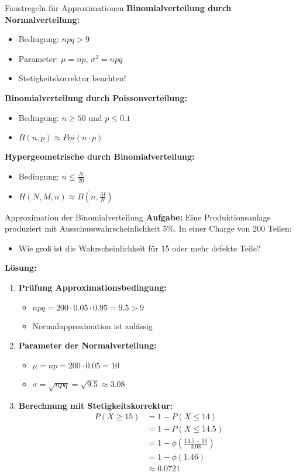 \begin{concept}{Faustregeln für Approximationen}
\textbf{Binomialverteilung durch Normalverteilung:}
\begin{itemize}
  \item Bedingung: $npq > 9$
  \item Parameter: $\mu = np$, $\sigma^2 = npq$
  \item Stetigkeitskorrektur beachten!
\end{itemize}

\textbf{Binomialverteilung durch Poissonverteilung:}
\begin{itemize}
  \item Bedingung: $n \geq 50$ und $p \leq 0.1$
  \item $B(n,p) \approx Poi(n \cdot p)$
\end{itemize}

\textbf{Hypergeometrische durch Binomialverteilung:}
\begin{itemize}
  \item Bedingung: $n \leq \frac{N}{20}$
  \item $H(N,M,n) \approx B(n,\frac{M}{N})$
\end{itemize}
\end{concept}

\begin{example}{Approximation der Binomialverteilung}
\textbf{Aufgabe:} Eine Produktionsanlage produziert mit Ausschusswahrscheinlichkeit 5\%. In einer Charge von 200 Teilen:
\begin{itemize}
\item Wie groß ist die Wahrscheinlichkeit für 15 oder mehr defekte Teile?
\end{itemize}

\textbf{Lösung:}
\begin{enumerate}
\item \textbf{Prüfung Approximationsbedingung:}
   \begin{itemize}
   \item $npq = 200 \cdot 0.05 \cdot 0.95 = 9.5 > 9$
   \item Normalapproximation ist zulässig
   \end{itemize}

\item \textbf{Parameter der Normalverteilung:}
   \begin{itemize}
   \item $\mu = np = 200 \cdot 0.05 = 10$
   \item $\sigma = \sqrt{npq} = \sqrt{9.5} \approx 3.08$
   \end{itemize}

\item \textbf{Berechnung mit Stetigkeitskorrektur:}
   \begin{align*}
   P(X \geq 15) &= 1 - P(X \leq 14) \\
   &= 1 - P(X \leq 14.5) \\
   &= 1 - \phi(\frac{14.5-10}{3.08}) \\
   &= 1 - \phi(1.46) \\
   &\approx 0.0721
   \end{align*}
\end{enumerate}
\end{example}

